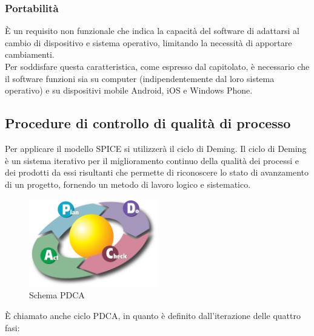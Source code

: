 \subsubsection{Portabilità}
È un requisito non funzionale che indica la capacità del software di adattarsi al cambio di dispositivo e sistema operativo, limitando la necessità di apportare cambiamenti.\\
Per soddisfare questa caratteristica, come espresso dal capitolato, è necessario che il software funzioni sia su computer (indipendentemente dal loro sistema operativo) e su dispositivi mobile Android, iOS e Windows Phone.

\subsection{Procedure di controllo di qualità di processo}
Per applicare il modello SPICE si utilizzerà il ciclo di Deming. Il ciclo di Deming è un sistema iterativo per il miglioramento continuo della qualità dei processi e dei prodotti da essi risultanti che permette di riconoscere lo stato di avanzamento di un progetto, fornendo un metodo di lavoro logico e sistematico.

\begin{figure}[h]
  \centering
    \includegraphics[width=0.5\textwidth]{./images/deming}
  \caption{Schema PDCA}
  \label{fig:deming}
\end{figure}

È chiamato anche ciclo PDCA, in quanto è definito dall'iterazione delle quattro fasi:
 
